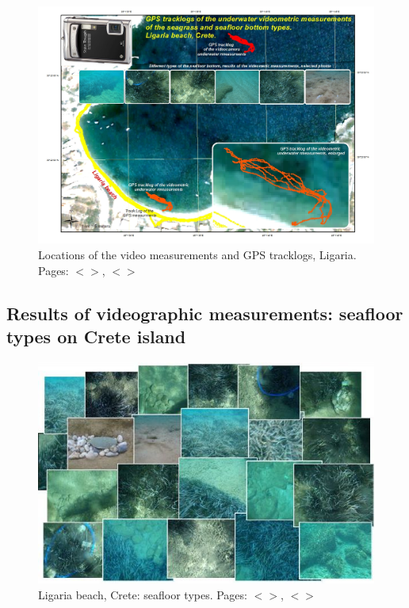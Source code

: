 \documentclass[11pt]{article}
\begin{document}
\begin{appendices}
\begin{figure}[H]
	\centering
	\includegraphics[scale=0.50]{Fig-21.jpg}
	\caption{Locations of the video measurements and GPS tracklogs, Ligaria. Pages: $<$\pageref{page-25}$>$, $<$\pageref{page-26}$>$}
	\label{fig:3.6}
\end{figure}

\subsection{Results of videographic measurements: seafloor types on Crete island}

\begin{figure}[H]
	\begin{center}
		\includegraphics[scale=0.67]{Fig-3-14.jpg}
		\caption{Ligaria beach, Crete: seafloor types. Pages: $<$\pageref{page-28}$>$, $<$\pageref{page-39}$>$}\label{fig:A.5}
	\end{center}
\end{figure}


\end{appendices}
\end{document}
